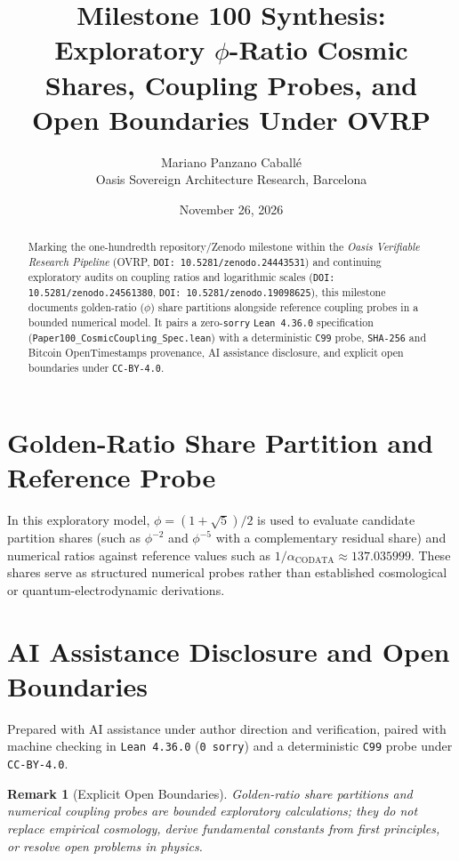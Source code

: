 \documentclass[11pt,a4paper]{article}
\title{Milestone 100 Synthesis: Exploratory $\phi$-Ratio Cosmic Shares, Coupling Probes, and Open Boundaries Under OVRP}
\author{Mariano Panzano Caball\'e \\ \small Oasis Sovereign Architecture Research, Barcelona}
\date{November 26, 2026}
\newtheorem{remark}{Remark}
\begin{document}
\maketitle

\begin{abstract}
Marking the one-hundredth repository/Zenodo milestone within the \emph{Oasis Verifiable Research Pipeline} (OVRP, \texttt{DOI: 10.5281/zenodo.24443531}) and continuing exploratory audits on coupling ratios and logarithmic scales (\texttt{DOI: 10.5281/zenodo.24561380}, \texttt{DOI: 10.5281/zenodo.19098625}), this milestone documents golden-ratio ($\phi$) share partitions alongside reference coupling probes in a bounded numerical model. It pairs a zero-\texttt{sorry} \texttt{Lean~4.36.0} specification (\texttt{Paper100\_CosmicCoupling\_Spec.lean}) with a deterministic \texttt{C99} probe, \texttt{SHA-256} and Bitcoin OpenTimestamps provenance, AI assistance disclosure, and explicit open boundaries under \texttt{CC-BY-4.0}.
\end{abstract}

\section{Golden-Ratio Share Partition and Reference Probe}
In this exploratory model, $\phi = (1+\sqrt{5})/2$ is used to evaluate candidate partition shares (such as $\phi^{-2}$ and $\phi^{-5}$ with a complementary residual share) and numerical ratios against reference values such as $1/\alpha_{\mathrm{CODATA}} \approx 137.035999$. These shares serve as structured numerical probes rather than established cosmological or quantum-electrodynamic derivations.

\section*{AI Assistance Disclosure and Open Boundaries}
Prepared with AI assistance under author direction and verification, paired with machine checking in \texttt{Lean~4.36.0} (\texttt{0~sorry}) and a deterministic \texttt{C99} probe under \texttt{CC-BY-4.0}.

\begin{remark}[Explicit Open Boundaries]
Golden-ratio share partitions and numerical coupling probes are bounded exploratory calculations; they do not replace empirical cosmology, derive fundamental constants from first principles, or resolve open problems in physics.
\end{remark}
\end{document}
